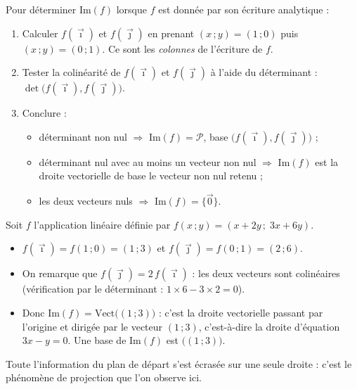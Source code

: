\documentclass[11pt]{article}
\begin{document}
\begin{methode}
Pour déterminer $\mathrm{Im}(f)$ lorsque $f$ est donnée par son écriture analytique :
\begin{enumerate}
\item Calculer $f(\vec{\imath})$ et $f(\vec{\jmath})$ en prenant $(x\,;y) = (1\,;0)$ puis $(x\,;y) = (0\,;1)$. Ce sont les \emph{colonnes} de l'écriture de $f$.
\item Tester la colinéarité de $f(\vec{\imath})$ et $f(\vec{\jmath})$ à l'aide du déterminant : $\det\bigl(f(\vec{\imath}), f(\vec{\jmath})\bigr)$.
\item Conclure :
\begin{itemize}
\item déterminant non nul $\Rightarrow$ $\mathrm{Im}(f) = \mathcal{P}$, base $\bigl(f(\vec{\imath}), f(\vec{\jmath})\bigr)$ ;
\item déterminant nul avec au moins un vecteur non nul $\Rightarrow$ $\mathrm{Im}(f)$ est la droite vectorielle de base le vecteur non nul retenu ;
\item les deux vecteurs nuls $\Rightarrow$ $\mathrm{Im}(f) = \{\vec{0}\}$.
\end{itemize}
\end{enumerate}
\end{methode}

\begin{exemplebox}
Soit $f$ l'application linéaire définie par $f(x\,;y) = (x + 2y\,;\; 3x + 6y)$.
\begin{itemize}
\item $f(\vec{\imath}) = f(1\,;0) = (1\,;3)$ et $f(\vec{\jmath}) = f(0\,;1) = (2\,;6)$.
\item On remarque que $f(\vec{\jmath}) = 2\,f(\vec{\imath})$ : les deux vecteurs sont colinéaires (vérification par le déterminant : $1 \times 6 - 3 \times 2 = 0$).
\item Donc $\mathrm{Im}(f) = \mathrm{Vect}\bigl((1\,;3)\bigr)$ : c'est la droite vectorielle passant par l'origine et dirigée par le vecteur $(1\,;3)$, c'est-à-dire la droite d'équation $3x - y = 0$. Une base de $\mathrm{Im}(f)$ est $\bigl((1\,;3)\bigr)$.
\end{itemize}
Toute l'information du plan de départ s'est \og écrasée \fg{} sur une seule droite : c'est le phénomène de projection que l'on observe ici.
\end{exemplebox}
\end{document}
